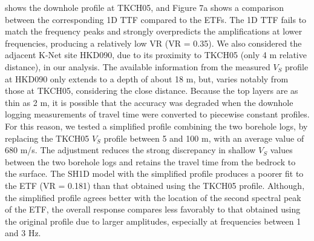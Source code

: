 { shows the downhole profile at TKCH05, and Figure 7a shows a comparison between the corresponding 1D TTF compared to the ETFs. The 1D TTF fails to match the frequency peaks and strongly overpredicts the amplifications at lower frequencies, producing a relatively low VR (VR = 0.35). We also considered the adjacent K-Net site HKD090, due to its proximity to TKCH05 (only 4 m relative distance), in our analysis. The available information from the measured $V_S$ profile at HKD090 only extends to a depth of about 18 m, but, varies notably from those at TKCH05, considering the close distance. Because the top layers are as thin as 2 m, it is possible that the accuracy was degraded when the downhole logging measurements of travel time were converted to piecewise constant profiles. For this reason, we tested a simplified profile combining the two borehole logs, by replacing the TKCH05 $V_S$ profile between 5 and 100 m, with an average value of 680 m/s. The adjustment reduces the strong discrepancy in shallow $V_S$ values between the two borehole logs and retains the travel time from the bedrock to the surface. The SH1D model with the simplified profile produces a poorer fit to the ETF (VR = 0.181) than that obtained using the TKCH05 profile. Although, the simplified profile agrees better with the location of the second spectral peak of the ETF, the overall response compares less favorably to that obtained using the original profile due to larger amplitudes, especially at frequencies between 1 and 3 Hz.

}

